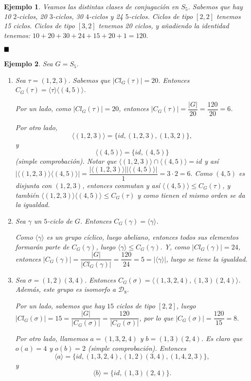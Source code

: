\documentclass[12pt]{article}
\newtheorem{example}{Ejemplo}[theorem]
\begin{document}
\begin{example}
Veamos las distintas clases de conjugación en $S_{5}$. Sabemos que hay 10 $2$-ciclos, 20 $3$-ciclos, 30 $4$-ciclos y 24 $5$-ciclos. Ciclos de tipo $[2,2]$ tenemos 15 ciclos. Ciclos de tipo $[3,2]$ tenemos 20 ciclos, y añadiendo la identidad tenemos: $10+20+30+24+15+20+1 = 120.$
\end{example}

$\hfill \blacksquare$

\begin{example}\label{eq:excentra} Sea $G = S_{5}$.
\begin{enumerate}
\item Sea $\tau = (1,2,3)$. Sabemos que $|Cl_{G}(\tau)| = 20$. Entonces $C_{G}(\tau) = \langle \tau \rangle \langle (4,5) \rangle$.

Por un lado, como $|Cl_{G}(\tau)| = 20$, entonces $|C_{G}(\tau)| = \dfrac{|G|}{20} = \dfrac{120}{20} = 6$.

Por otro lado, $$\langle (1,2,3) \rangle = \lbrace id, (1,2,3), (1,3,2) \rbrace,$$ y $$\langle (4,5)\rangle = \lbrace id, (4,5) \rbrace $$ (simple comprobación). Notar que $\langle (1,2,3) \rangle \cap \langle (4,5) \rangle = id$ y así $|\langle (1,2,3) \rangle \langle (4,5) \rangle|= \dfrac{|\langle (1,2,3) \rangle||\langle (4,5) \rangle|}{1} = 3 \cdot 2 = 6.$ Como $(4,5)$ es disjunta con $(1,2,3)$, entonces conmutan y así $\langle (4,5) \rangle \leq C_{G}(\tau)$, y también $\langle (1,2,3) \rangle \langle (4,5) \rangle \leq C_{G}(\tau)$ y como tienen el mismo orden se da la igualdad.
\item Sea $\gamma$ un $5$-ciclo de $G$. Entonces $C_{G}(\gamma) = \langle \gamma \rangle$. 

Como $\langle \gamma \rangle$ es un grupo cíclico, luego abeliano, entonces todos sus elementos formarán parte de $C_{G}(\gamma)$, luego $\langle \gamma \rangle \leq C_{G}(\gamma)$. Y, como $|Cl_{G}(\gamma)| = 24$, entonces $|C_{G}(\gamma)| = \dfrac{|G|}{|Cl_{G}(\gamma)|} = \dfrac{120}{24} = 5 = |\langle \gamma \rangle |$, luego se tiene la igualdad. 
\item Sea $\sigma = (1,2)(3,4)$. Entonces $C_{G}(\sigma) = \langle (1,3,2,4),(1,3)(2,4)\rangle$. Además, este grupo es isomorfo a $\mathcal{D}_{8}$. 

Por un lado, sabemos que hay $15$ ciclos de tipo $[2,2]$, luego $|Cl_{G}(\sigma)|=15 = \dfrac{|G|}{|C_{G}(\sigma)|} = \dfrac{120}{|C_{G}(\sigma)|}$, por lo que $|C_{G}(\sigma)| = \dfrac{120}{15}=8.$

Por otro lado, llamemos $a = (1,3,2,4)$ y $b = (1,3)(2,4)$. Es claro que $o(a) = 4$ y $o(b)=2$ (simple comprobación). Entonces $$\langle a \rangle = \lbrace id, (1,3,2,4), (1,2)(3,4), (1,4,2,3) \rbrace,$$ y $$\langle b \rangle = \lbrace id, (1,3)(2,4) \rbrace.$$


\end{enumerate}
\end{example}
\end{document}
